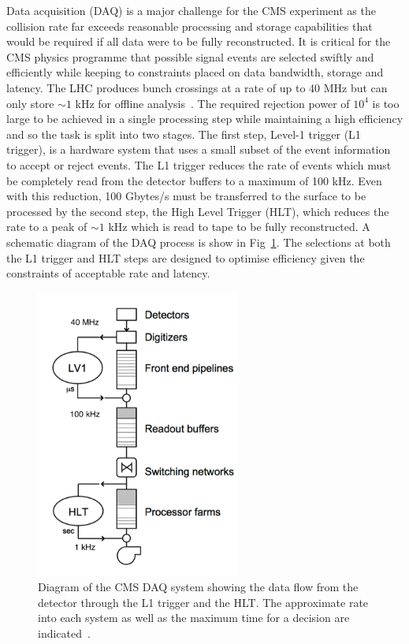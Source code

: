 Data acquisition (DAQ) is a major challenge for the CMS experiment as the collision rate far exceeds reasonable processing 
and storage capabilities that would be required if all data were to be fully reconstructed. It is critical
for the CMS physics programme that 
possible signal events are selected swiftly and efficiently while keeping to constraints placed on data bandwidth, storage and 
latency. The LHC produces bunch crossings at a rate of up to 40 MHz but can only
store $\sim1$ kHz for offline analysis~\cite{daq_tdr}. The required rejection power of $10^4$ is too large to be achieved
in a single processing step while maintaining a high efficiency and so the task is split into two stages.
The first step, Level-1 trigger (L1 trigger), is a hardware system that uses a small subset of the event information
to accept or reject events. The L1 trigger reduces the rate of events which must be completely 
read from the detector buffers to a maximum of 100 kHz. Even with this reduction, 100 Gbytes/s must be transferred to the surface
to be processed by the second step, the High Level Trigger (HLT), which reduces the rate to a peak of $\sim1$ kHz which is 
read to tape to be fully reconstructed. A schematic diagram of the DAQ process is show in Fig~\ref{fig:DAQ_SLICE}. 
The selections at both the L1 trigger and HLT steps are designed to optimise efficiency given the constraints 
of acceptable rate and latency.

\begin{figure}
\centering
    \includegraphics[width=0.6\textwidth]{./Figures/detector/daq_sys}
  \caption{Diagram of the CMS DAQ system showing the data flow from the detector through the L1 trigger
and the HLT. The approximate rate into each system as well as the maximum time for a decision are indicated~\cite{daq_tdr}.}
  \label{fig:DAQ_SLICE}
\end{figure}

